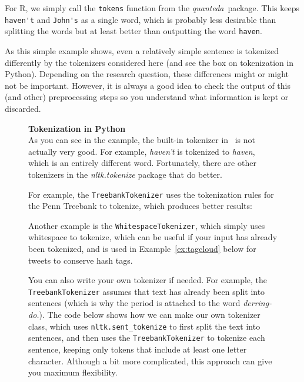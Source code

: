 For R, we simply call the \texttt{tokens} function from the \emph{quanteda}\ package.
This keeps \verb|haven't| and \verb|John's| as a single word, which is probably less desirable than splitting the words
but at least better than outputting the word \verb|haven|.

As this simple example shows, even a relatively simple sentence is tokenized differently by the tokenizers considered here (and see the box on tokenization in Python).
Depending on the research question, these differences might or might not be important.
However, it is always a good idea to check the output of this (and other) preprocessing steps so you understand
what information is kept or discarded.

\begin{figure}
\begin{feature}\textbf{Tokenization in Python}\\
  As you can see in the example, the built-in tokenizer in \sklearn\ is not actually very good.
  For example, \emph{haven't} is tokenized to \emph{haven}, which is an entirely different word.
  Fortunately, there are other tokenizers in the \emph{nltk.tokenize} package that do better.

  For example, the \texttt{TreebankTokenizer} uses the tokenization rules for the Penn Treebank
  to tokenize, which produces better results:


  Another example is the \texttt{WhitespaceTokenizer}, which simply uses whitespace to tokenize,
  which can be useful if your input has already been tokenized,
  and is used in Example~\ref{ex:tagcloud} below for tweets to conserve hash tags.


  You can also write your own tokenizer if needed.
  For example, the \texttt{TreebankTokenizer} assumes that text has already been split into sentences
  (which is why the period is attached to the word \emph{derring-do.}).
  The code below shows how we can make our own tokenizer class,
  which uses \texttt{nltk.sent\_tokenize} to first split the text into sentences,
  and then uses the \texttt{TreebankTokenizer} to tokenize each sentence,
  keeping only tokens that include at least one letter character.
  Although a bit more complicated, this approach can give you maximum flexibility.

\end{feature}
\end{figure}

